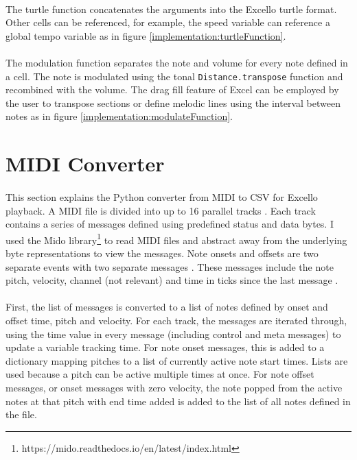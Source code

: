 \paragraph{} The turtle function concatenates the arguments into the Excello turtle format. Other cells can be referenced, for example, the speed variable can reference a global tempo variable as in figure \ref{implementation:turtleFunction}.

\paragraph{} The modulation function separates the note and volume for every note defined in a cell. The note is modulated using the tonal \texttt{Distance.transpose} function and recombined with the volume. The drag fill feature of Excel can be employed by the user to transpose sections or define melodic lines using the interval between notes as in figure \ref{implementation:modulateFunction}.

\section{MIDI Converter}

\paragraph{} This section explains the Python converter from MIDI to CSV for Excello playback. A MIDI file is divided into up to 16 parallel tracks \cite{midiSpec}. Each track contains a series of messages defined using predefined status and data bytes. I used the Mido library\footnote{https://mido.readthedocs.io/en/latest/index.html} to read MIDI files and abstract away from the underlying byte representations to view the messages. Note onsets and offsets are two separate events with two separate messages \cite{midiSpec}. These messages include the note pitch, velocity, channel (not relevant) and time in ticks since the last message \cite{midoSpec}.

\paragraph{} First, the list of messages is converted to a list of notes defined by onset and offset time, pitch and velocity. For each track, the messages are iterated through, using the time value in every message (including control and meta messages) to update a variable tracking time. For note onset messages, this is added to a dictionary mapping pitches to a list of currently active note start times. Lists are used because a pitch can be active multiple times at once. For note offset messages, or onset messages with zero velocity, the note popped from the active notes at that pitch with end time added is added to the list of all notes defined in the file.

